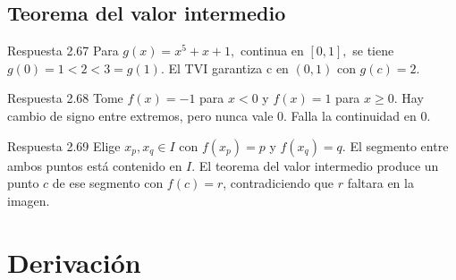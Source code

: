 \documentclass[10pt,a4paper,oneside,openany]{book}
\begin{document}
\section{Teorema del valor intermedio}
\begin{PSevenAnswerFixed}{Respuesta 2.67}
Para \(g(x)=x^{5}+x+1,\) continua en \([0,1],\) se tiene \(g(0)=1<2<3=g(1)\). El TVI garantiza c en \((0,1)\) con \(g(c)=2\).
\end{PSevenAnswerFixed}
\begin{PSevenAnswerFixed}{Respuesta 2.68}
Tome \(f(x)=-1\) para \(x<0\) y \(f(x)=1\) para \(x\ge 0\). Hay cambio de signo entre extremos, pero nunca vale \(0\). Falla la continuidad en \(0\).
\end{PSevenAnswerFixed}
\begin{PSevenAnswerFixed}{Respuesta 2.69}
Elige \(x_p,x_q\in I\) con \(f(x_p)=p\) y \(f(x_q)=q\). El segmento entre ambos puntos está contenido en \(I\). El teorema del valor intermedio produce un punto \(c\) de ese segmento con \(f(c)=r\), contradiciendo que \(r\) faltara en la imagen.
\end{PSevenAnswerFixed}
\chapter{Derivación}
\end{document}
